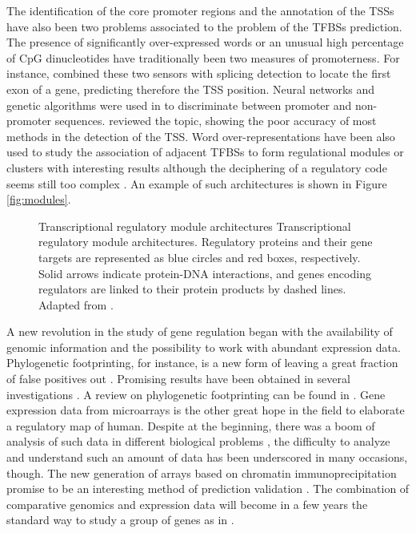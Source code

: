 The identification of the core promoter regions and the annotation of the TSSs have also been two problems
associated to the problem of the TFBSs prediction. The presence of significantly over-expressed words or 
an unusual high percentage of CpG dinucleotides have traditionally been two measures of promoterness. 
For instance, \citet{davuluri:2001a} combined these two sensors with splicing detection to locate the first 
exon of a gene, predicting therefore the TSS position. Neural networks and genetic algorithms were used
in \citep{knudsen:1999a} to discriminate between promoter and non-promoter sequences. \citet{fickett:1997a}
reviewed the topic, showing the poor accuracy of most methods in the detection of the TSS. Word 
over-representations have been also used to study the 
association of adjacent TFBSs to form regulational modules or clusters with interesting results although 
the deciphering of a regulatory code seems still too complex \citep{beer:2004a,sharan:2003a,terai:2004a,thompson:2004a}. An example of such architectures is shown in Figure \ref{fig:modules}.

\begin{figure}[t!]
\begin{center}
\setlength{\fboxsep}{2pt}
          {Transcriptional regulatory module architectures}%
          {Transcriptional regulatory module architectures.}%
          {Regulatory proteins and their gene targets are represented as blue circles and red boxes, respectively. Solid arrows indicate protein-DNA interactions, and genes encoding regulators are linked to their protein products by dashed lines. Adapted from \citep{harbison:2004a}.}
\end{center}
\end{figure}

A new revolution in the study of gene regulation began with the availability of genomic information and 
the possibility to work with abundant expression data. Phylogenetic footprinting, for instance, is a
new form of leaving a great fraction of false positives out \citep{duret:1997a,fickett:2000a}. 
Promising results have been obtained in several investigations \citep{blanchette:2002a,krivan:2001a,lenhard:2003a}. A review on phylogenetic footprinting can be found in \citep{wasserman:2004a}. 
Gene expression data from microarrays is the other great hope in the field to elaborate a regulatory map of 
human. Despite at the beginning, there was a boom of analysis of such data in different biological 
problems \citep{beltran:2003a,golub:1999a,shoemaker:2001a}, the difficulty to analyze and understand such 
an amount of data has been underscored in many occasions, though. The new generation of arrays based on 
chromatin immunoprecipitation promise to be an interesting method of prediction validation 
\citep{odom:2004a}. The combination of comparative genomics and expression data will become in a few years
the standard way to study a group of genes as in \citep{xie:2005a}.

